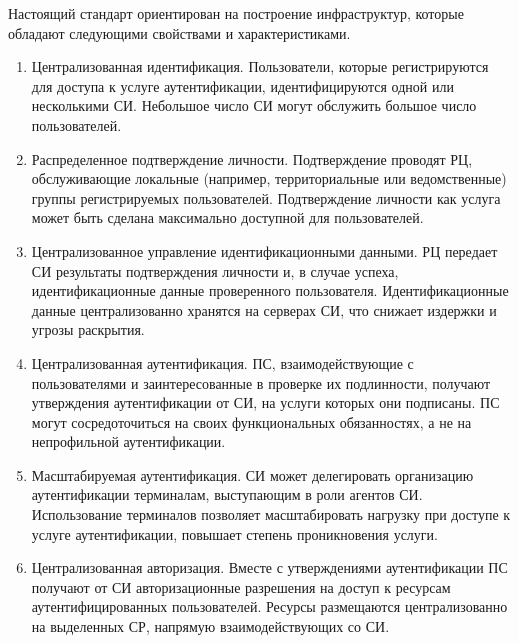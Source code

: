 Настоящий стандарт ориентирован на построение инфраструктур, которые обладают
следующими свойствами и характеристиками.

\begin{enumerate}
\item
Централизованная идентификация.
%
Пользователи, которые регистрируются для доступа к услуге аутентификации, 
идентифицируются одной или несколькими СИ. 
%
Небольшое число СИ могут обслужить большое число пользователей.

\item
Распределенное подтверждение личности.
%
Подтверждение проводят РЦ, обслуживающие локальные (например, 
территориальные или ведомственные) группы регистрируемых пользователей. 
%
Подтверждение личности как услуга может быть сделана максимально доступной для 
пользователей. 

\item
Централизованное управление идентификационными данными.
%
РЦ передает СИ результаты подтверждения личности и, в случае успеха, 
идентификационные данные проверенного пользователя.
%
Идентификационные данные централизованно хранятся на серверах СИ, что 
снижает издержки и угрозы раскрытия.

\item
Централизованная аутентификация.
%
ПС, взаимодействующие с пользователями и заинтересованные в проверке 
их подлинности, получают утверждения аутентификации от СИ, на услуги которых 
они подписаны.
%
ПС могут сосредоточиться на своих функциональных обязанностях, а не на 
непрофильной аутентификации.

\item
Масштабируемая аутентификация.
%
СИ может делегировать организацию аутентификации терминалам, выступающим в роли
агентов СИ. Использование терминалов позволяет масштабировать нагрузку при
доступе к услуге аутентификации, повышает степень проникновения услуги.

\item
Централизованная авторизация. 
%
Вместе с утверждениями аутентификации ПС получают от СИ авторизационные 
разрешения на доступ к ресурсам аутентифицированных пользователей. Ресурсы 
размещаются централизованно на выделенных СР, напрямую взаимодействующих со СИ.
\end{enumerate}

